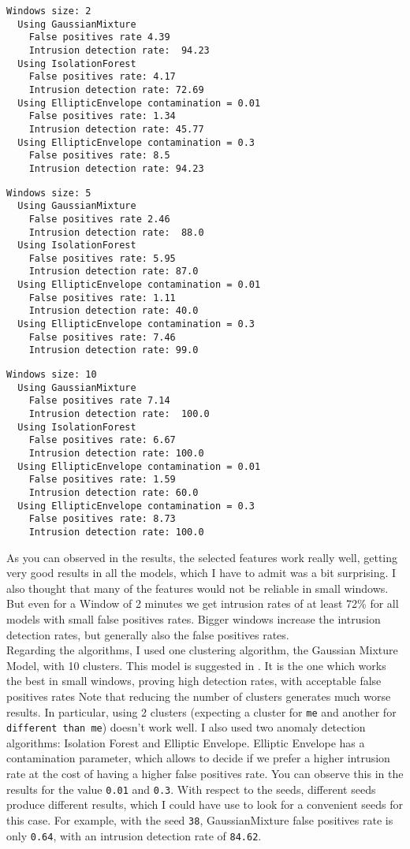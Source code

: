 \documentclass[oneside, 12pt]{article}
\begin{document}
\begin{lstlisting}
Windows size: 2
  Using GaussianMixture
    False positives rate 4.39
    Intrusion detection rate:  94.23
  Using IsolationForest 
    False positives rate: 4.17
    Intrusion detection rate: 72.69
  Using EllipticEnvelope contamination = 0.01
    False positives rate: 1.34
    Intrusion detection rate: 45.77
  Using EllipticEnvelope contamination = 0.3
    False positives rate: 8.5
    Intrusion detection rate: 94.23
\end{lstlisting}
\begin{lstlisting}
Windows size: 5
  Using GaussianMixture
    False positives rate 2.46
    Intrusion detection rate:  88.0
  Using IsolationForest 
    False positives rate: 5.95
    Intrusion detection rate: 87.0
  Using EllipticEnvelope contamination = 0.01
    False positives rate: 1.11
    Intrusion detection rate: 40.0
  Using EllipticEnvelope contamination = 0.3
    False positives rate: 7.46
    Intrusion detection rate: 99.0
\end{lstlisting}
\begin{lstlisting}
Windows size: 10
  Using GaussianMixture
    False positives rate 7.14
    Intrusion detection rate:  100.0
  Using IsolationForest 
    False positives rate: 6.67
    Intrusion detection rate: 100.0
  Using EllipticEnvelope contamination = 0.01
    False positives rate: 1.59
    Intrusion detection rate: 60.0
  Using EllipticEnvelope contamination = 0.3
    False positives rate: 8.73
    Intrusion detection rate: 100.0
\end{lstlisting}

As you can observed in the results, the selected features work really well, getting very good results in all the models, which I have to admit was a bit surprising.
I also thought that many of the features would not be reliable in small windows.
But even for a Window of 2 minutes we get intrusion rates of at least 72\% for all models with small false positives rates.
Bigger windows increase the intrusion detection rates, but generally also the false positives rates.\\

Regarding the algorithms, I used one clustering algorithm, the Gaussian Mixture Model, with 10 clusters.
This model is suggested in \cite{ruu_journal}.
It is the one which works the best in small windows, proving high detection rates, with acceptable false positives rates
Note that reducing the number of clusters generates much worse results.
In particular, using 2 clusters (expecting a cluster for \texttt{me} and another for \texttt{different than me}) doesn't work well.
I also used two anomaly detection algorithms: Isolation Forest and Elliptic Envelope.
Elliptic Envelope has a contamination parameter, which allows to decide if we prefer a higher intrusion rate at the cost of having a higher false positives rate.
You can observe this in the results for the value \texttt{0.01} and \texttt{0.3}.
With respect to the seeds, different seeds produce different results, which I could have use to look for a convenient seeds for this case.
For example, with the seed \texttt{38}, GaussianMixture false positives rate is only \texttt{0.64}, with an intrusion detection rate of \texttt{84.62}.\\
\end{document}
